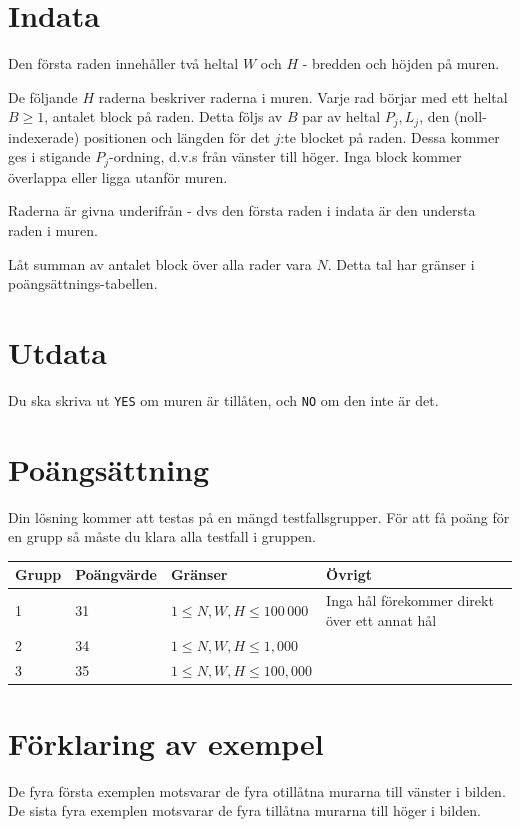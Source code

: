 \section*{Indata}
Den första raden innehåller två heltal $W$ och $H$ - bredden och höjden på muren.

De följande $H$ raderna beskriver raderna i muren.
Varje rad börjar med ett heltal $B \ge 1$, antalet block på raden.
Detta följs av $B$ par av heltal $P_j, L_j$, den (noll-indexerade) positionen och längden för det $j$:te blocket på raden. Dessa kommer ges i stigande $P_j$-ordning, d.v.s från vänster till höger.
Inga block kommer överlappa eller ligga utanför muren.

Raderna är givna underifrån - dvs den första raden i indata är den understa raden i muren.

Låt summan av antalet block över alla rader vara $N$.
Detta tal har gränser i poängsättnings-tabellen.

\section*{Utdata}
Du ska skriva ut \texttt{YES} om muren är tillåten, och \texttt{NO} om den inte är det.

\section*{Poängsättning}
Din lösning kommer att testas på en mängd testfallsgrupper. För att få poäng för en grupp
så måste du klara alla testfall i gruppen.

\begin{tabular}{| l | l | l | l |}
\hline
Grupp & Poängvärde & Gränser & Övrigt \\ \hline
1     & 31         & $1 \le N, W, H \le 100\,000$ & Inga hål förekommer direkt över ett annat hål \\ \hline
2     & 34         & $1 \le N, W, H \le 1,000$ & \\ \hline
3     & 35         & $1 \le N, W, H \le 100,000$ & \\ \hline
\end{tabular}

\section*{Förklaring av exempel}
De fyra första exemplen motsvarar de fyra otillåtna murarna till vänster i bilden.
De sista fyra exemplen motsvarar de fyra tillåtna murarna till höger i bilden.
